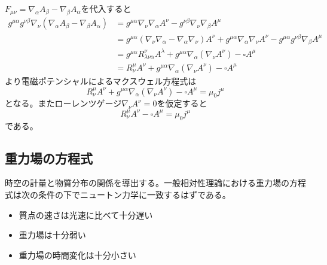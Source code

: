     $F_{\mu\nu} = \nabla_\alpha A_\beta - \nabla_\beta A_\alpha$を代入すると
    \begin{align*}
        g^{\mu\alpha}g^{\nu\beta}\nabla_\nu(\nabla_\alpha A_\beta - \nabla_\beta A_\alpha)
            &= g^{\mu\alpha}\nabla_\nu\nabla_\alpha A^\nu - g^{\nu\beta}\nabla_\nu\nabla_\beta A^\mu\\
            &= g^{\mu\alpha}(\nabla_\nu\nabla_\alpha - \nabla_\alpha\nabla_\nu)A^\nu + g^{\mu\alpha}\nabla_\alpha\nabla_\nu A^\nu - g^{\mu\alpha}g^{\nu\beta}\nabla_\beta A^\mu\\
            &= g^{\mu\alpha}R^\nu_{\lambda\nu\alpha}A^\lambda + g^{\mu\alpha}\nabla_\alpha(\nabla_\nu A^\nu) - \square A^\mu\\
            &= R^\mu_\nu A^\nu + g^{\mu\alpha}\nabla_\alpha(\nabla_\nu A^\nu) - \square A^\mu
    \end{align*}
    より電磁ポテンシャルによるマクスウェル方程式は
        \[R^\mu_\nu A^\nu + g^{\mu\alpha}\nabla_\alpha(\nabla_\nu A^\nu) - \square A^\mu = \mu_0 j^\mu\]
    となる。またローレンツゲージ$\nabla_\nu A^\nu = 0$を仮定すると
        \[R^\mu_\nu A^\nu - \square A^\mu = \mu_0 j^\mu\]
    である。

\subsection{重力場の方程式}
    時空の計量と物質分布の関係を導出する。一般相対性理論における重力場の方程式は次の条件の下でニュートン力学に一致するはずである。
    \begin{itemize}
        \item 質点の速さは光速に比べて十分遅い
        \item 重力場は十分弱い
        \item 重力場の時間変化は十分小さい
    \end{itemize}

